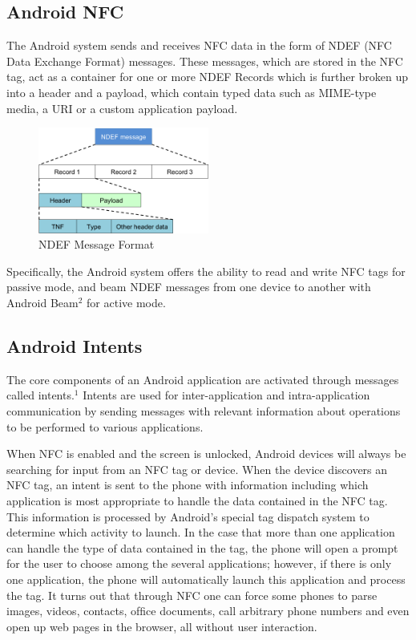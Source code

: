 \documentclass[12pt]{article}
\begin{document}
\subsection{Android NFC}

The Android system sends and receives NFC data in the form of NDEF (NFC Data Exchange Format) messages. These messages, which are stored in the NFC tag, act as a container for one or more NDEF Records which is further broken up into a header and a payload, which contain typed data such as MIME-type media, a URI or a custom application payload.

\begin{figure}[h!]
	\centering
		\includegraphics[width=0.5\textwidth]{NDEF_Format.png}
	\caption{NDEF Message Format}
\end{figure}


Specifically, the Android system offers the ability to read and write NFC tags for passive mode, and beam NDEF messages from one device to another with Android Beam$^{2}$ for active mode. 

\subsection{Android Intents}
The core components of an Android application are activated through messages called intents.$^{1}$ Intents are used for inter-application and intra-application communication by sending messages with relevant information about operations to be performed to various applications.  

When NFC is enabled and the screen is unlocked, Android devices will always be searching for input from an NFC tag or device. When the device discovers an NFC tag, an intent is sent to the phone with information including which application is most appropriate to handle the data contained in the NFC tag. This information is processed by Android's special tag dispatch system to determine which activity to launch. In the case that more than one application can handle the type of data contained in the tag, the phone will open a prompt for the user to choose among the several applications; however, if there is only one application, the phone will automatically launch this application and process the tag. It turns out that through NFC one can force some phones to parse images, videos, contacts, ofﬁce documents, call arbitrary phone numbers and even open up web pages in the browser, all without user interaction.  
\end{document}
